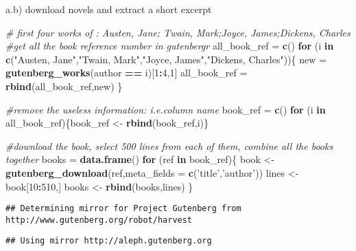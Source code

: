 \documentclass[]{article}
\newenvironment{Shaded}{\begin{snugshade}}{\end{snugshade}}
\newcommand{\KeywordTok}[1]{\textcolor[rgb]{0.13,0.29,0.53}{\textbf{#1}}}
\newcommand{\DataTypeTok}[1]{\textcolor[rgb]{0.13,0.29,0.53}{#1}}
\newcommand{\DecValTok}[1]{\textcolor[rgb]{0.00,0.00,0.81}{#1}}
\newcommand{\StringTok}[1]{\textcolor[rgb]{0.31,0.60,0.02}{#1}}
\newcommand{\CommentTok}[1]{\textcolor[rgb]{0.56,0.35,0.01}{\textit{#1}}}
\newcommand{\ControlFlowTok}[1]{\textcolor[rgb]{0.13,0.29,0.53}{\textbf{#1}}}
\newcommand{\OperatorTok}[1]{\textcolor[rgb]{0.81,0.36,0.00}{\textbf{#1}}}
\newcommand{\NormalTok}[1]{#1}
\begin{document}
a.b) download novels and extract a short excerpt

\begin{Shaded}
\begin{Highlighting}[]
\CommentTok{# first four works of : Austen, Jane; Twain, Mark;Joyce, James;Dickens, Charles}
\CommentTok{#get all the book reference number in gutenbergr}
\NormalTok{all_book_ref =}\StringTok{ }\KeywordTok{c}\NormalTok{()}
\ControlFlowTok{for}\NormalTok{ (i }\ControlFlowTok{in} \KeywordTok{c}\NormalTok{(}\StringTok{"Austen, Jane"}\NormalTok{,}\StringTok{"Twain, Mark"}\NormalTok{,}\StringTok{"Joyce, James"}\NormalTok{,}\StringTok{"Dickens, Charles"}\NormalTok{))\{}
\NormalTok{   new =}\StringTok{ }\KeywordTok{gutenberg_works}\NormalTok{(author }\OperatorTok{==}\StringTok{ }\NormalTok{i)[}\DecValTok{1}\OperatorTok{:}\DecValTok{4}\NormalTok{,}\DecValTok{1}\NormalTok{]}
\NormalTok{   all_book_ref =}\StringTok{ }\KeywordTok{rbind}\NormalTok{(all_book_ref,new)}
\NormalTok{\}}

\CommentTok{#remove the useless information: i.e.column name}
\NormalTok{book_ref =}\StringTok{ }\KeywordTok{c}\NormalTok{()}
\ControlFlowTok{for}\NormalTok{ (i }\ControlFlowTok{in}\NormalTok{ all_book_ref)\{book_ref <-}\StringTok{ }\KeywordTok{rbind}\NormalTok{(book_ref,i)\}}

\CommentTok{#download the book, select 500 lines from each of them, combine all the books together}
\NormalTok{books =}\StringTok{ }\KeywordTok{data.frame}\NormalTok{()}
\ControlFlowTok{for}\NormalTok{ (ref }\ControlFlowTok{in}\NormalTok{ book_ref)\{}
\NormalTok{  book <-}\StringTok{ }\KeywordTok{gutenberg_download}\NormalTok{(ref,}\DataTypeTok{meta_fields =} \KeywordTok{c}\NormalTok{(}\StringTok{'title'}\NormalTok{,}\StringTok{'author'}\NormalTok{))}
\NormalTok{  lines <-}\StringTok{ }\NormalTok{book[}\DecValTok{10}\OperatorTok{:}\DecValTok{510}\NormalTok{,]}
\NormalTok{  books <-}\StringTok{ }\KeywordTok{rbind}\NormalTok{(books,lines)}
\NormalTok{\}}
\end{Highlighting}
\end{Shaded}

\begin{verbatim}
## Determining mirror for Project Gutenberg from http://www.gutenberg.org/robot/harvest
\end{verbatim}

\begin{verbatim}
## Using mirror http://aleph.gutenberg.org
\end{verbatim}
\end{document}
